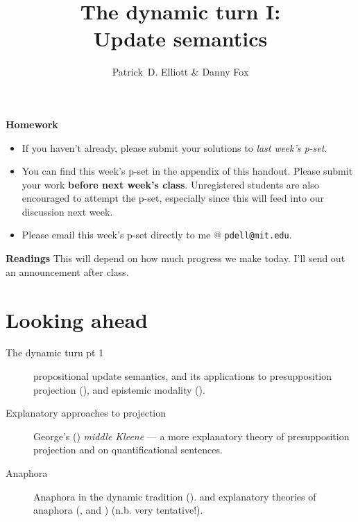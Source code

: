 \documentclass[nols,twoside,nofonts,nobib,nohyper]{tufte-handout}
\title{The dynamic turn I:\\
Update semantics}
\author[Patrick D. Elliott \& Danny Fox]{Patrick~D. Elliott \& Danny Fox}
\theoremstyle{definition}
\begin{document}
\maketitle%

\begin{tcolorbox}
\textbf{Homework}
\tcblower
\begin{itemize}
   \item If you haven't already, please submit your solutions to \textit{last week's p-set}.
  \item You can find this week's p-set in the appendix of this handout. Please submit your work \textbf{before next week's class}. Unregistered students are also encouraged to attempt the p-set, especially since this will feed into our discussion next week.
    \item Please email this week's p-set directly to me @ \texttt{pdell@mit.edu}.
\end{itemize}
\end{tcolorbox}

\begin{tcolorbox}
\textbf{Readings}
\tcblower
This will depend on how much progress we make today. I'll send out an announcement after class.
\end{tcolorbox}

\section{Looking ahead}

\begin{description}
    \item[The dynamic turn pt 1] propositional update semantics, and its applications to presupposition projection (\citealt{Heim1983}), and epistemic modality (\citealt{Veltman1996,GroenendijkEtAl1996}).
    \item[Explanatory approaches to projection] George's (\citeyear{George2007,George2008,George2014}) \textit{middle Kleene} --- a more explanatory theory of presupposition projection and \citet{Fox2013} on quantificational sentences.
    \item[Anaphora] Anaphora in the dynamic tradition (\citealt{Heim1982,GroenendijkStokhof1991,Dekker1994}).
      and explanatory theories of anaphora (\citealt{Rothschild2017}, \citealt{Elliott2020b,Elliott2020d} and \citealt{Mandelkern2020a,Mandelkern2020b}) (n.b. very tentative!).
\end{description}
\end{document}
